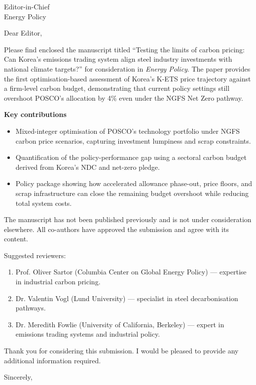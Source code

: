 \documentclass[11pt]{letter}
\begin{document}
\begin{letter}{Editor-in-Chief\\Energy Policy}
\opening{Dear Editor,}

Please find enclosed the manuscript titled ``Testing the limits of carbon pricing: Can Korea's emissions trading system align steel industry investments with national climate targets?'' for consideration in \emph{Energy Policy}. The paper provides the first optimisation-based assessment of Korea's K-ETS price trajectory against a firm-level carbon budget, demonstrating that current policy settings still overshoot POSCO's allocation by 4\% even under the NGFS Net Zero pathway.

\textbf{Key contributions}
\begin{itemize}
  \item Mixed-integer optimisation of POSCO's technology portfolio under NGFS carbon price scenarios, capturing investment lumpiness and scrap constraints.
  \item Quantification of the policy-performance gap using a sectoral carbon budget derived from Korea's NDC and net-zero pledge.
  \item Policy package showing how accelerated allowance phase-out, price floors, and scrap infrastructure can close the remaining budget overshoot while reducing total system costs.
\end{itemize}

The manuscript has not been published previously and is not under consideration elsewhere. All co-authors have approved the submission and agree with its content.

Suggested reviewers:
\begin{enumerate}
  \item Prof. Oliver Sartor (Columbia Center on Global Energy Policy) --- expertise in industrial carbon pricing.
  \item Dr. Valentin Vogl (Lund University) --- specialist in steel decarbonisation pathways.
  \item Dr. Meredith Fowlie (University of California, Berkeley) --- expert in emissions trading systems and industrial policy.
\end{enumerate}

Thank you for considering this submission. I would be pleased to provide any additional information required.

\closing{Sincerely,}

\end{letter}
\end{document}
